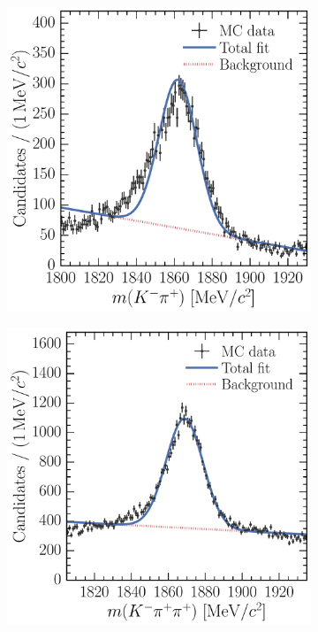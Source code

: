 \begin{figure}
  \begin{subfigure}[b]{0.5\textwidth}
    \centering
    \includegraphics[width=\textwidth]{figures/production/efficiencies/D0ToKpi_BKGCAT_fit}
    \caption{\DzToKpi}
    \label{fig:prod:effs:truth:fit:D0ToKpi}
  \end{subfigure}
  \begin{subfigure}[b]{0.5\textwidth}
    \centering
    \includegraphics[width=\textwidth]{figures/production/efficiencies/DpToKpipi_BKGCAT_fit}

\end{subfigure}
\end{figure}
